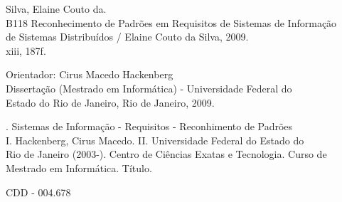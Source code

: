 \vspace*{14.0cm}
\begin{framed}
    \fontsize{10pt}{10pt}\selectfont \hspace*{0.5cm} Silva, Elaine Couto da. \\ B118 \hspace{0.8cm}Reconhecimento de Padrões em Requisitos de Sistemas de Informação \\ \hspace*{1.3cm} de Sistemas Distribuídos / Elaine Couto da Silva, 2009. \\ \hspace*{1.3cm} xiii, 187f.
    \vspace{0.3cm}

    \noindent \hspace*{1.5cm} \fontsize{10pt}{10pt}\selectfont Orientador: Cirus Macedo Hackenberg \\ \hspace*{1.6cm}Dissertação (Mestrado em Informática) - Universidade Federal do \\ \hspace*{1.2cm}Estado do Rio de Janeiro, Rio de Janeiro, 2009.
    \vspace{0.3cm}

    \noindent \hspace*{1.7cm} \fontsize{10pt}{10pt}. Sistemas de Informação - Requisitos - Reconhimento de Padrões \\ \hspace*{1.5cm} I. Hackenberg, Cirus Macedo. II. Universidade Federal do Estado do \\ \hspace*{1.5cm} Rio de Janeiro (2003-). Centro de Ciências Exatas e Tecnologia. Curso de \\ \hspace*{1.5cm} Mestrado em Informática. Título.
    \vspace{0.3cm}
    \begin{flushright}
        \fontsize{10pt}{10pt}\selectfont CDD - 004.678
    \end{flushright}
\end{framed}
